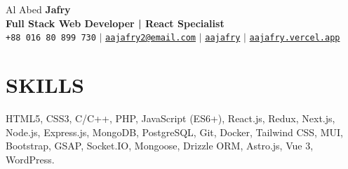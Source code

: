 \documentclass[letterpaper,11pt]{article}
\begin{document}
\begin{center}
  {\Huge Al Abed \textbf{\Huge Jafry}} \\ \vspace{5pt}
  \textbf{\Large\textcolor{dark-grey}{Full Stack Web Developer | React Specialist}} \\ \vspace{3pt}
  \small \faPhone* \texttt{+88 016 80 899 730} \hspace{1pt} $|$
  \hspace{1pt} \faEnvelope \hspace{2pt} \href{mailto:aajafry2@email.com}{\texttt{aajafry2@email.com}} \hspace{1pt} $|$ 
  \hspace{1pt} \faGithub \hspace{2pt} \href{https://github.com/aajafry}{\texttt{aajafry}} \hspace{1pt} $|$ 
  \hspace{1pt} \faGlobe \hspace{2pt} \href{https://aajafry.vercel.app}{\texttt{aajafry.vercel.app}} \hspace{1pt}
\end{center}

\section{SKILLS}
 \begin{itemize}[leftmargin=0in, label={}]
    \small{\item{
    {HTML5, CSS3, C/C++, PHP, JavaScript (ES6+), React.js, Redux, Next.js, Node.js, Express.js, MongoDB, PostgreSQL, Git, Docker, Tailwind CSS, MUI, Bootstrap, GSAP, Socket.IO, Mongoose, Drizzle ORM, Astro.js, Vue 3, WordPress.}
    }}
 \end{itemize}

\end{document}
